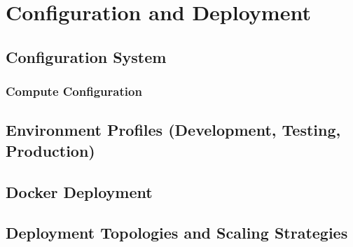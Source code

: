 \documentclass[a4paper,twoside]{sapthesis}
\begin{document}
\chapter{Configuration and Deployment}
\label{ch:deployment}


\section{Configuration System}
\label{sec:configuration}

\subsection{Compute Configuration}

\section{Environment Profiles (Development, Testing, Production)}
\label{sec:env-profiles}

\section{Docker Deployment}
\label{sec:docker-deployment}

\section{Deployment Topologies and Scaling Strategies}
\label{sec:deployment-topologies}
\end{document}
